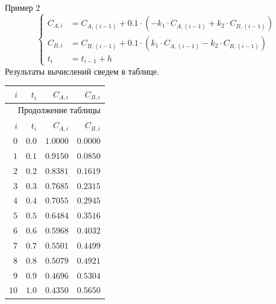 \documentclass[aspectratio=169, mathserif]{beamer}	%
\begin{document}
\begin{frame}[fragile]{Пример 2}
\scriptsize
\begin{equation*}
	\left\{
	\begin{aligned}
		C_{A, i} &= C_{A, (i-1)} + 0.1 \cdot \left(-k_1\cdot C_{A, (i-1)} + k_2 \cdot C_{B, (i-1)}\right) \\
		C_{B, i} &= C_{B, (i-1)} + 0.1 \cdot \left(k_1\cdot C_{A, (i-1)} - k_2 \cdot C_{B, (i-1)}\right) \\
		t_i &= t_{i-1} + h
	\end{aligned}
	\right.
\end{equation*}
Результаты вычислений сведем в таблице.
\vfill
\begin{longtable}{|r|r|r|r|}

	\hline \multicolumn{1}{|r|}{$i$} & \multicolumn{1}{r|}{$t_i$} & \multicolumn{1}{r|}{$C_{A,i}$} & \multicolumn{1}{r|}{$C_{B,i}$}  \\
	\hline
	\endfirsthead

	\multicolumn{4}{r}{Продолжение таблицы \thetable{}} \\
	\hline
	\multicolumn{1}{|r|}{$i$} & \multicolumn{1}{r|}{$t_i$} & \multicolumn{1}{r|}{$C_{A,i}$} & \multicolumn{1}{r|}{$C_{B,i}$}  \\
	\hline
	\endhead

	$0$  &$0.0$ & $1.0000$ & $0.0000$  \\
	\hline

	$1$  &$0.1$ & $0.9150$ & $0.0850$  \\
	\hline

	$2$  &$0.2$ & $0.8381$ & $0.1619$  \\
	\hline

	$3$  &$0.3$ & $0.7685$ & $0.2315$ \\
	\hline

	$4$  &$0.4$ & $0.7055$ & $0.2945$  \\
	\hline

	$5$  &$0.5$ & $0.6484$ & $0.3516$  \\
	\hline

	$6$  &$0.6$ & $0.5968$ & $0.4032$  \\
	\hline

	$7$  &$0.7$ & $0.5501$ & $0.4499$  \\
	\hline

	$8$  &$0.8$ & $0.5079$ & $0.4921$  \\
	\hline

	$9$  &$0.9$ & $0.4696$ & $0.5304$  \\
	\hline

	$10$  &$1.0$ & $0.4350$ & $0.5650$  \\
	\hline
\end{longtable}
\vfill
\end{frame}
\end{document}
